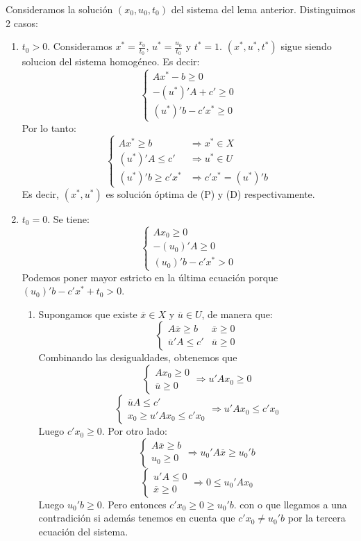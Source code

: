 \documentclass[PM.tex]{subfiles}
\begin{document}
\begin{dem} Consideramos la solución $(x_0,u_0,t_0)$ del sistema del lema anterior. Distinguimos 2 casos:
\begin{enumerate}
	\item $t_0 > 0$. Consideramos $x^* = \frac{x_0}{t_0}$, $u^* = \frac{u_0}{t_0}$ y $t^* = 1$. $(x^*,u^*,t^*)$ sigue siendo solucion del sistema homogéneo. Es decir:
\[\begin{cases}
	Ax^* - b ≥ 0\\
	-(u^*)'A + c' ≥ 0\\
	(u^*)'b - c'x^* ≥ 0
\end{cases}\]
Por lo tanto:
\[\begin{cases}
	Ax^* ≥ b & \Rightarrow x^* \in X\\
	(u^*)'A ≤ c' & \Rightarrow u^* \in U\\
	(u^*)'b ≥ c'x^* & \Rightarrow c'x^* = (u^*)'b
\end{cases}\]
Es decir, $(x^*,u^*)$ es solución óptima de (P) y (D) respectivamente.
	\item $t_0=0$. Se tiene:
\[\begin{cases}
	Ax_0 ≥ 0\\
	-(u_0)'A  ≥ 0\\
	(u_0)'b - c'x^* > 0
\end{cases}\]
	Podemos poner mayor estricto en la última ecuación porque $(u_0)'b-c'x^*+t_0 > 0$.
	\begin{enumerate}
	\item Supongamos que existe $\overline{x} \in X$ y $\overline{u} \in U$, de manera que:
	\[\begin{cases}
		A\overline{x} ≥ b & \overline{x} ≥ 0\\
		\overline{u}'A ≤ c' & \overline{u} ≥ 0
	\end{cases}\]
	Combinando las desigualdades, obtenemos que
	\[ \begin{cases}Ax_0 ≥ 0\\\overline{u} ≥ 0\end{cases} \Rightarrow u'Ax_0≥0 \]
	\[ \begin{cases}\overline{u}A ≤ c'\\x_0 ≥ u'Ax_0 ≤ c'x_0 \end{cases} \Rightarrow u'Ax_0≤c'x_0 \]
	Luego $c'x_0 ≥ 0$. Por otro lado:
	\[ \begin{cases}A\overline{x} ≥ b\\u_0 ≥ 0\end{cases} \Rightarrow u_0'A\overline{x}≥u_0'b \]
	\[ \begin{cases}u'A ≤ 0\\\overline{x} ≥ 0 \end{cases} \Rightarrow 0 ≤ u_0'Ax_0 \]
	Luego $u_0'b ≥ 0$. Pero entonces $c'x_0 ≥ 0 ≥ u_0' b$. con o que llegamos a una contradición si además tenemos en cuenta que $c'x_0 \neq u_0' b$ por la tercera ecuación del sistema.
	

\end{enumerate}
\end{enumerate}
\end{dem}
\end{document}
